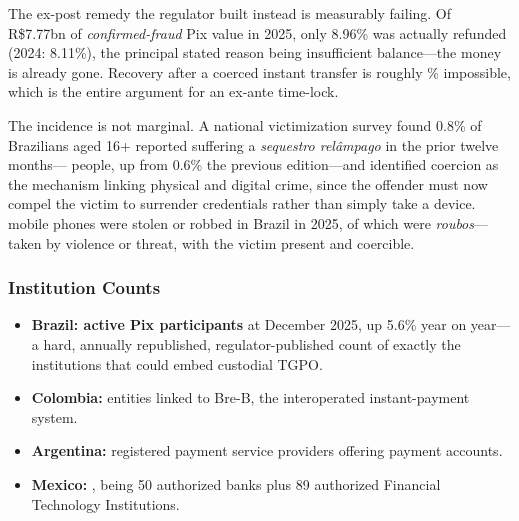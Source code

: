 The ex-post remedy the regulator built instead is measurably failing. Of
R\$\num[round-precision=2]{7.77}bn of \emph{confirmed-fraud} Pix value in 2025, only
\num[round-precision=2]{8.96}\% was actually refunded (2024:
\num[round-precision=2]{8.11}\%), the principal stated reason being insufficient
balance---the money is already gone\cite{bcb2026med}. Recovery after a coerced instant
transfer is roughly \% impossible, which is the entire argument for an
ex-ante time-lock.

The incidence is not marginal. A national victimization survey found
\num[round-precision=1]{0.8}\% of Brazilians aged 16+ reported suffering a
\textit{sequestro rel\^{a}mpago} in the prior twelve months--- people, up
from \num[round-precision=1]{0.6}\% the previous edition---and identified coercion as
the mechanism linking physical and digital crime, since the offender must now compel
the victim to surrender credentials rather than simply take a
device\cite{fbsp2025vitimizacao}.  mobile phones were stolen or robbed
in Brazil in 2025, of which  were \textit{roubos}---taken by violence or
threat, with the victim present and coercible\cite{fbsp2026anuario}.


\subsubsection*{Institution Counts}

\begin{itemize}[nosep]
  \item \textbf{Brazil: \numint{\tamSegTwoInstBrazil} active Pix participants} at
    December 2025, up \num[round-precision=1]{5.6}\% year on year---a hard,
    annually republished, regulator-published count of exactly the institutions that
    could embed custodial TGPO\cite{bcb2026pixreport}.
  \item \textbf{Colombia: \numint{\tamSegTwoInstColombia}} entities linked to Bre-B,
    the interoperated instant-payment system\cite{banrep2026breb}.
  \item \textbf{Argentina: \numint{\tamSegTwoInstArgentina}} registered payment
    service providers offering payment accounts\cite{bcra2025pagos}.
  \item \textbf{Mexico: \numint{\tamSegTwoInstMexico}}, being 50 authorized banks plus
    89 authorized Financial Technology Institutions\cite{cnbv2026banca}.
\end{itemize}

